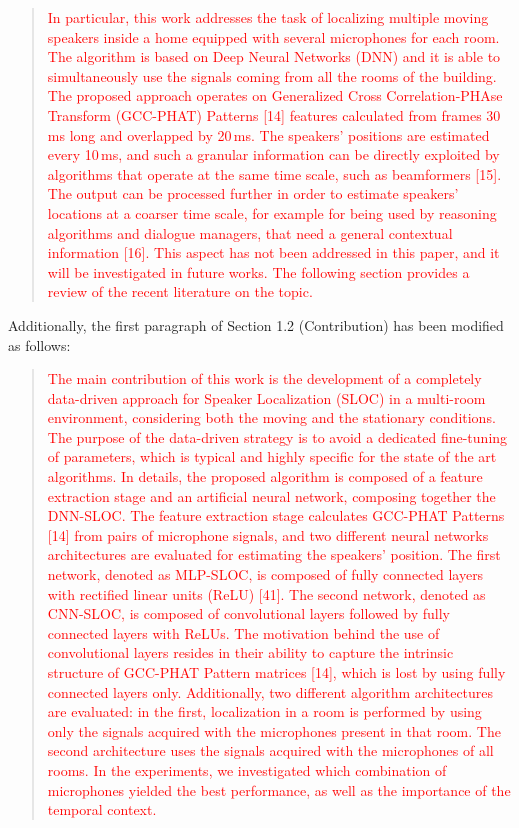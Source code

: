 \documentclass[11pt, technote, letterpaper, oneside, onecolumn]{IEEEtran}
\begin{document}
\begin{enumerate}
\begin{quote}
\textcolor{red}{
In particular, this work addresses the task of localizing multiple moving speakers inside a home equipped with several microphones for each room. The algorithm is based on Deep Neural Networks (DNN) and it is able to simultaneously use the signals coming from all the rooms of the building. The proposed approach operates on Generalized Cross Correlation-PHAse Transform (GCC-PHAT) Patterns [14] features calculated from frames 30\,ms long and overlapped by 20\,ms. The speakers' positions are estimated every 10\,ms, and such a granular information can be directly exploited by algorithms that operate at the same time scale, such as beamformers [15]. The output can be processed further in order to estimate speakers' locations at a coarser time scale, for example for being used by reasoning algorithms and dialogue managers, that need a general contextual information [16]. This aspect has not been addressed in this paper, and it will be investigated in future works. The following section provides a review of the recent literature on the topic.
}
\end{quote}

Additionally, the first paragraph of Section 1.2 (Contribution) has been modified as follows:
	\begin{quote}
		\textcolor{red}{
		The main contribution of this work is the development of a completely data-driven approach for Speaker Localization (SLOC) in a multi-room environment, considering both the moving and the stationary conditions. 		The purpose of the data-driven strategy is to avoid a dedicated fine-tuning of parameters, which is typical and highly specific for the state of the art algorithms.
		In details, the proposed algorithm is composed of a feature extraction stage and an artificial neural network, composing together the DNN-SLOC. The feature extraction stage calculates GCC-PHAT Patterns [14] from pairs of microphone signals, and two different neural networks architectures are evaluated for estimating the speakers' position. The first network, denoted as MLP-SLOC, is composed of fully connected layers with rectified linear units (ReLU) [41]. The second network, denoted as CNN-SLOC, is composed of convolutional layers followed by fully connected layers with ReLUs. The motivation behind the use of convolutional layers resides in their ability to capture the intrinsic structure of GCC-PHAT Pattern matrices [14], which is lost by using fully connected layers only. Additionally, two different algorithm architectures are evaluated: in the first, localization in a room is performed by using only the signals acquired with the microphones present in that room. The second architecture uses the signals acquired with the microphones of all rooms. In the experiments, we investigated which combination of microphones yielded the best performance, as well as the importance of the temporal context.
		}
	\end{quote}


\end{enumerate}
\end{document}
